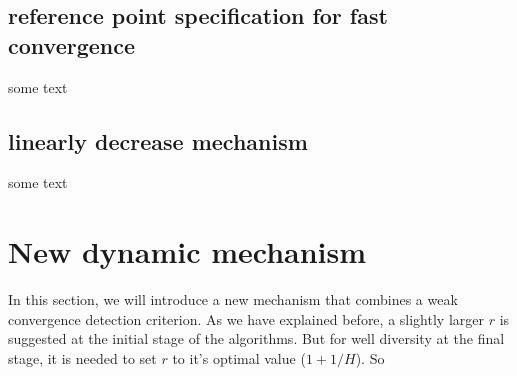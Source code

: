 \documentclass[conference]{IEEEtran}
\begin{document}
\subsection{reference point specification for fast convergence}
some text

% 
\subsection{linearly decrease mechanism}
some text

% 
\section{New dynamic mechanism}
In this section,
we will introduce a new mechanism that combines a weak convergence detection criterion. 
As we have explained before, 
a slightly larger $r$ is suggested at the initial stage of the algorithms. 
But for well diversity at the final stage,
it is needed to set $r$ to it's optimal value ($1+1/H$). 
So 


%
%
%
\end{document}
